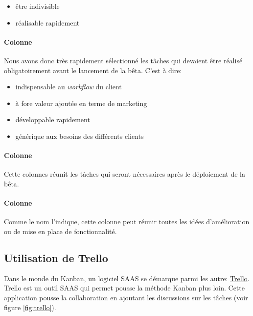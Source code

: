 \documentclass[]{report}
\begin{document}
      \begin{itemize}
        \item être indivisible
        \item réalisable rapidement
      \end{itemize}

      \paragraph{Colonne }

        Nous avons donc très rapidement sélectionné les tâches qui devaient être réalisé obligatoirement avant le lancement de la bêta. C'est à dire:

        \begin{itemize}
          \item indispensable au \textit{workflow} du client
          \item à fore valeur ajoutée en terme de marketing
          \item développable rapidement
          \item générique aux besoins des différents clients
        \end{itemize}

      \paragraph{Colonne }

        Cette colonnes réunit les tâches qui seront nécessaires après le déploiement de la bêta.

      \paragraph{Colonne }

        Comme le nom l'indique, cette colonne peut réunir toutes les idées d'amélioration ou de mise en place de fonctionnalité.

    \subsection{Utilisation de Trello}

      Dans le monde du Kanban, un logiciel SAAS se démarque parmi les autre: \href{http://trello.com/}{Trello}. Trello est un outil SAAS qui permet pousse la méthode Kanban plus loin. Cette application pousse la collaboration en ajoutant les discussions sur les tâches (voir figure \ref{fig:trello}).
\end{document}
